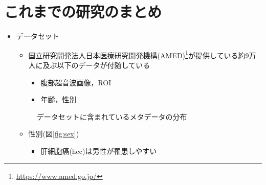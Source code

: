 \documentclass[a4j]{ujarticle}
\newcommand{\Fref}[1]{\mbox{図\ref{fig:#1}}}
\begin{document}
	\section{これまでの研究のまとめ}
        \begin{itemize}
            \item データセット
            \begin{itemize}
                \item 国立研究開発法人日本医療研究開発機構(AMED)\footnote{\url{https://www.amed.go.jp/}}が提供している約9万人に及ぶ以下のデータが付随している
                \begin{itemize}
                    \item 腹部超音波画像，ROI
                    \item 年齢，性別
                \end{itemize}
            \end{itemize}
            \begin{figure}[h]
                \centering
                \caption{データセットに含まれているメタデータの分布}
            \end{figure}
            \begin{itemize}
                \item 性別(\Fref{sex})
                \begin{itemize}
                    \item 肝細胞癌(hcc)は男性が罹患しやすい

\end{itemize}
\end{itemize}
\end{itemize}
\end{document}

